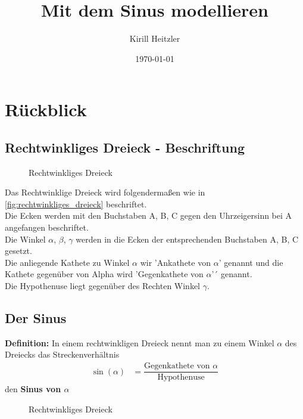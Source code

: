 \documentclass[12pt,a4paper]{article}
\title{Mit dem Sinus modellieren}
\author{Kirill Heitzler}
\date{\today}
\begin{document}
\maketitle
\begin{figure}[h!] 
    
\end{figure}
\newpage

\tableofcontents

\newpage

\section{Rückblick}

\subsection{Rechtwinkliges Dreieck - Beschriftung} 
\begin{figure}[hb!]
    \centering
    \def\svgwidth{200px}
    
    \caption{Rechtwinkliges Dreieck}
  	\label{fig:rechtwinkliges_dreieck}
\end{figure}
\noindent
Das Rechtwinklige Dreieck wird folgendermaßen wie in \autoref{fig:rechtwinkliges_dreieck} beschriftet. \\
Die Ecken werden mit den Buchstaben A, B, C gegen den Uhrzeigersinn bei A angefangen beschriftet. \\
Die Winkel $\alpha$, $\beta$, $\gamma$ werden in die Ecken der entsprechenden Buchstaben A, B, C gesetzt. \\
Die anliegende Kathete zu Winkel $\alpha$ wir 'Ankathete von $\alpha$' genannt und die Kathete gegenüber von Alpha wird 'Gegenkathete von $\alpha$'´ genannt. \\
Die Hypothenuse liegt gegenüber des Rechten Winkel $\gamma$.

\subsection{Der Sinus}
\textbf{Definition:} In einem rechtwinkligen Dreieck nennt man zu einem Winkel $\alpha$ des Dreiecks das Streckenverhältnis  
\begin{align}
 \sin(\alpha) &= \dfrac{\text{Gegenkathete von $\alpha$}}{\text{Hypothenuse}}
\end{align}
den \textbf{Sinus von $\alpha$}
\begin{figure}[hb!]
    \centering
    \def\svgwidth{200px}
    
    \caption{Rechtwinkliges Dreieck}
  	\label{fig:rechtwinkliges_dreieck}
\end{figure}
\newpage
\end{document}
